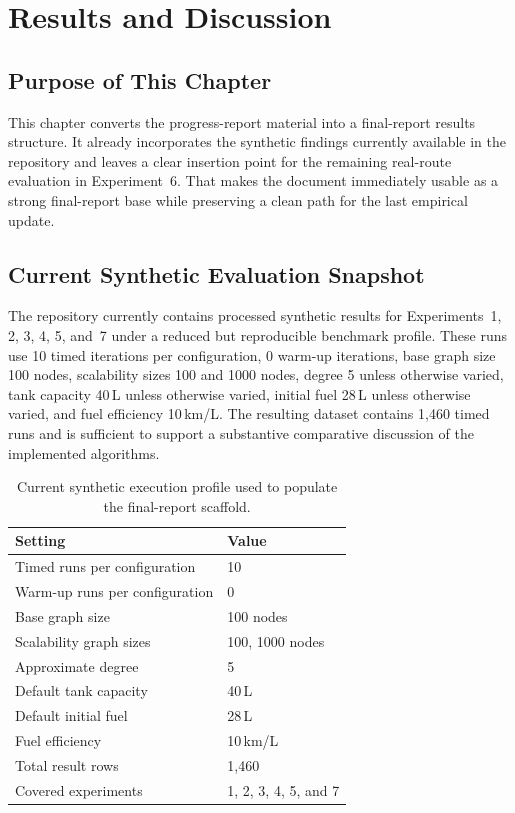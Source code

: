 \chapter{Results and Discussion}
\label{ch:results}

\section{Purpose of This Chapter}

This chapter converts the progress-report material into a final-report results structure.
It already incorporates the synthetic findings currently available in the repository and leaves
a clear insertion point for the remaining real-route evaluation in Experiment~6.
That makes the document immediately usable as a strong final-report base while preserving a
clean path for the last empirical update.

\section{Current Synthetic Evaluation Snapshot}
\label{sec:current_synth_snapshot}

The repository currently contains processed synthetic results for Experiments~1, 2, 3, 4, 5,
and~7 under a reduced but reproducible benchmark profile.
These runs use 10 timed iterations per configuration, 0 warm-up iterations, base graph size
100 nodes, scalability sizes 100 and 1000 nodes, degree 5 unless otherwise varied, tank
capacity 40\,L unless otherwise varied, initial fuel 28\,L unless otherwise varied, and fuel
efficiency 10\,km/L.
The resulting dataset contains 1,460 timed runs and is sufficient to support a substantive
comparative discussion of the implemented algorithms.

\begin{table}[H]
    \centering
    \caption{Current synthetic execution profile used to populate the final-report scaffold.}
    \label{tab:final_current_synth_profile}
    \begin{tabular}{ll}
        \toprule
        Setting & Value \\
        \midrule
        Timed runs per configuration & 10 \\
        Warm-up runs per configuration & 0 \\
        Base graph size & 100 nodes \\
        Scalability graph sizes & 100, 1000 nodes \\
        Approximate degree & 5 \\
        Default tank capacity & 40\,L \\
        Default initial fuel & 28\,L \\
        Fuel efficiency & 10\,km/L \\
        Total result rows & 1,460 \\
        Covered experiments & 1, 2, 3, 4, 5, and 7 \\
        \bottomrule
    \end{tabular}
\end{table}

